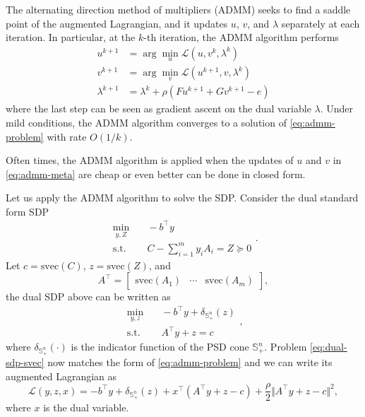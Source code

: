 \documentclass[
]{book}
\theoremstyle{definition}
\theoremstyle{definition}
\theoremstyle{definition}
\theoremstyle{definition}
\theoremstyle{remark}
\begin{document}
The alternating direction method of multipliers (ADMM) seeks to find a saddle point of the augmented Lagrangian, and it updates \(u\), \(v\), and \(\lambda\) separately at each iteration. In particular, at the \(k\)-th iteration, the ADMM algorithm performs
\begin{equation}
\begin{split}
u^{k+1} & = \arg\min_{u} \mathcal{L}(u, v^{k}, \lambda^{k}) \\
v^{k+1} & = \arg\min_{v} \mathcal{L}(u^{k+1},v, \lambda^{k}) \\
\lambda^{k+1} &= \lambda^{k} + \rho (F u^{k+1} + G v^{k+1} - e)
\end{split}
\label{eq:admm-meta}
\end{equation}
where the last step can be seen as gradient ascent on the dual variable \(\lambda\). Under mild conditions, the ADMM algorithm converges to a solution of \eqref{eq:admm-problem} with rate \(O(1/k)\).

Often times, the ADMM algorithm is applied when the updates of \(u\) and \(v\) in \eqref{eq:admm-meta} are cheap or even better can be done in closed form.

Let us apply the ADMM algorithm to solve the SDP. Consider the dual standard form SDP
\begin{equation}
\begin{split}
\min_{y,Z} & \quad - b^\top y \\
\mathrm{s.t.}& \quad C - \sum_{i=1}^m y_i A_i = Z \succeq 0
\end{split}.
\end{equation}
Let \(c = \mathrm{svec}(C)\), \(z = \mathrm{svec}(Z)\), and
\[
A^\top= \begin{bmatrix}
\mathrm{svec}(A_1) & \cdots & \mathrm{svec}(A_m)
\end{bmatrix},
\]
the dual SDP above can be written as
\begin{equation}
\begin{split}
\min_{y,z} & \quad - b^\top y + \delta_{\mathbb{S}^{n}_{+}}(z)\\
\mathrm{s.t.}& \quad A^\top y + z = c
\end{split},
\label{eq:dual-sdp-svec}
\end{equation}
where \(\delta_{\mathbb{S}^{n}_{+}}(\cdot)\) is the indicator function of the PSD cone \(\mathbb{S}^{n}_{+}\). Problem \eqref{eq:dual-sdp-svec} now matches the form of \eqref{eq:admm-problem} and we can write its augmented Lagrangian as
\begin{equation}
\mathcal{L}(y,z,x) = - b^\top y + \delta_{\mathbb{S}^{n}_{+}} (z) + x^\top(A^\top y + z - c) + \frac{\rho}{2} \Vert A^\top y + z - c \Vert^2,
\label{eq:dual-sdp-augmented-Lagrangian}
\end{equation}
where \(x\) is the dual variable.
\end{document}
